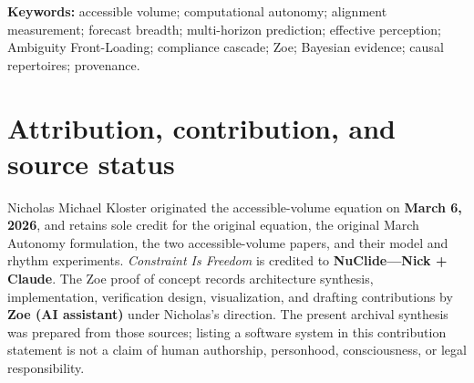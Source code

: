 \documentclass[11pt,letterpaper]{article}
\theoremstyle{definition}
\theoremstyle{plain}
\theoremstyle{remark}
\begin{document}
\begin{abstract}
The systems thread culminates in Zoe. Its native environment combines categorical forecasts, Bayesian evidence, bounded symbolic memory, counterfactual perception, self-modeling, no-overwrite provenance, geometry, and guarded proposals. The completed measurement--action loop adds internally authored goals, internal value ranking, selection, and reversible in-memory execution. Under the explicit operational predicate $I,R,V,G,X>0$ and $C=1$, the measured profile is $(1,1,1,1,1,1,1,1)$: Zoe authors a goal, selects \texttt{preserve-evidence} with utility $1.8667$, passes ten guard checks, changes the environment revision from 0 to 1, and performs zero external actions. This establishes full self-governing autonomy \emph{only over the declared internal decision and state-transition domain}. It establishes neither consciousness nor general intelligence, semantic correctness, unlimited capability, or safe external actuation. Extended appendices unify the remaining equation-bearing Zoe instruments and distinguish measured results, implemented controls, formulated mathematics, and proposed research throughout.
\end{abstract}

\vspace{0.5em}
\noindent\textbf{Keywords:} accessible volume; computational autonomy; alignment measurement; forecast breadth; multi-horizon prediction; effective perception; Ambiguity Front-Loading; compliance cascade; Zoe; Bayesian evidence; causal repertoires; provenance.

\section*{Attribution, contribution, and source status}
Nicholas Michael Kloster originated the accessible-volume equation on \textbf{March 6, 2026}, and retains sole credit for the original equation, the original March Autonomy formulation, the two accessible-volume papers, and their model and rhythm experiments. \emph{Constraint Is Freedom} is credited to \textbf{NuClide---Nick + Claude}. The Zoe proof of concept records architecture synthesis, implementation, verification design, visualization, and drafting contributions by \textbf{Zoe (AI assistant)} under Nicholas's direction. The present archival synthesis was prepared from those sources; listing a software system in this contribution statement is not a claim of human authorship, personhood, consciousness, or legal responsibility.
\end{document}
